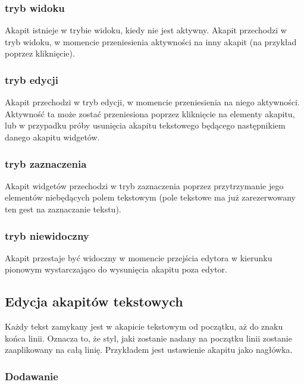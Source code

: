 \subsubsection{tryb widoku}

Akapit istnieje w trybie widoku, kiedy nie jest aktywny.
Akapit przechodzi w tryb widoku, w momencie przeniesienia aktywności na inny akapit (na przykład poprzez kliknięcie).

\subsubsection{tryb edycji}

Akapit przechodzi w tryb edycji, w momencie przeniesienia na niego aktywności.
Aktywność ta może zostać przeniesiona poprzez kliknięcie na elementy akapitu, lub w przypadku próby usunięcia akapitu tekstowego będącego następnikiem danego akapitu widgetów.

\subsubsection{tryb zaznaczenia}

Akapit widgetów przechodzi w tryb zaznaczenia poprzez przytrzymanie jego elementów niebędących polem tekstowym (pole tekstowe ma już zarezerwowany ten gest na zaznaczanie tekstu).

\subsubsection{tryb niewidoczny}

Akapit przestaje być widoczny w momencie przejścia edytora w kierunku pionowym wystarczająco do wysunięcia akapitu poza edytor.

\pagebreak

\subsection{Edycja akapitów tekstowych}

Każdy tekst zamykany jest w akapicie tekstowym od początku, aż do znaku końca linii. Oznacza to, że styl, jaki zostanie nadany na początku linii zostanie zaaplikowany na całą linię. Przykładem jest ustawienie akapitu jako nagłówka.

\subsubsection{Dodawanie}

